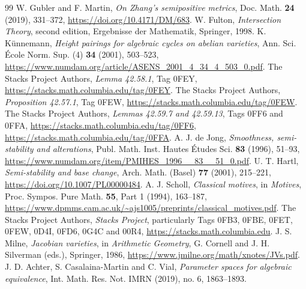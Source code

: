 \documentclass[11pt]{article}
\theoremstyle{definition}
\theoremstyle{remark}
\numberwithin{equation}{section}
\begin{document}
\begin{thebibliography}{99}
 W. Gubler and F. Martin, \emph{On Zhang's semipositive metrics}, Doc. Math. \textbf{24} (2019), 331--372, \url{https://doi.org/10.4171/DM/683}.
 W. Fulton, \emph{Intersection Theory}, second edition, Ergebnisse der Mathematik, Springer, 1998.
 K. K\"unnemann, \emph{Height pairings for algebraic cycles on abelian varieties}, Ann. Sci. \'Ecole Norm. Sup. (4) \textbf{34} (2001), 503--523, \url{https://www.numdam.org/article/ASENS_2001_4_34_4_503_0.pdf}.
 The Stacks Project Authors, \emph{Lemma 42.58.1}, Tag 0FEY, \url{https://stacks.math.columbia.edu/tag/0FEY}.
 The Stacks Project Authors, \emph{Proposition 42.57.1}, Tag 0FEW, \url{https://stacks.math.columbia.edu/tag/0FEW}.
 The Stacks Project Authors, \emph{Lemmas 42.59.7 and 42.59.13}, Tags 0FF6 and 0FFA, \url{https://stacks.math.columbia.edu/tag/0FF6}, \url{https://stacks.math.columbia.edu/tag/0FFA}.
 A. J. de Jong, \emph{Smoothness, semi-stability and alterations}, Publ. Math. Inst. Hautes \'Etudes Sci. \textbf{83} (1996), 51--93, \url{https://www.numdam.org/item/PMIHES_1996__83__51_0.pdf}.
 U. T. Hartl, \emph{Semi-stability and base change}, Arch. Math. (Basel) \textbf{77} (2001), 215--221, \url{https://doi.org/10.1007/PL00000484}.
 A. J. Scholl, \emph{Classical motives}, in \emph{Motives}, Proc. Sympos. Pure Math. \textbf{55}, Part 1 (1994), 163--187, \url{https://www.dpmms.cam.ac.uk/~ajs1005/preprints/classical_motives.pdf}.
 The Stacks Project Authors, \emph{Stacks Project}, particularly Tags 0FB3, 0FBE, 0FET, 0FEW, 0D4I, 0FD6, 0G4C and 00R4, \url{https://stacks.math.columbia.edu}.
 J. S. Milne, \emph{Jacobian varieties}, in \emph{Arithmetic Geometry}, G. Cornell and J. H. Silverman (eds.), Springer, 1986, \url{https://www.jmilne.org/math/xnotes/JVs.pdf}.
 J. D. Achter, S. Casalaina-Martin and C. Vial, \emph{Parameter spaces for algebraic equivalence}, Int. Math. Res. Not. IMRN (2019), no. 6, 1863--1893.
\end{thebibliography}
\end{document}
